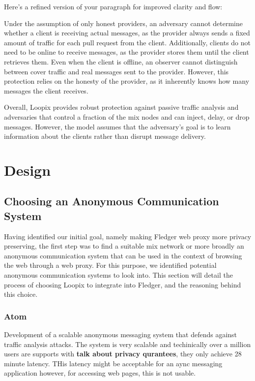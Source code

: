 \documentclass[a4paper,11pt,oneside]{report}
\begin{document}
Here's a refined version of your paragraph for improved clarity and flow:

Under the assumption of only honest providers, an adversary cannot determine whether a client is receiving actual messages, as the provider always sends a fixed amount of traffic for each pull request from the client. Additionally, clients do not need to be online to receive messages, as the provider stores them until the client retrieves them.  Even when the client is offline, an observer cannot distinguish between cover traffic and real messages sent to the provider. However, this protection relies on the honesty of the provider, as it inherently knows how many messages the client receives.

Overall, Loopix provides robust protection against passive traffic analysis and adversaries that control a fraction of the mix nodes and can inject, delay, or drop messages. However, the model assumes that the adversary’s goal is to learn information about the clients rather than disrupt message delivery.

\chapter{Design}


\section{Choosing an Anonymous Communication System}
\label{sec:mixers}
Having identified our initial goal, namely making Fledger web proxy more privacy preserving, the first step was to find a suitable mix network or more broadly an anonymous communication system that can be used in the context of browsing the web through a web proxy. For this purpose, we identified potential anonymous communication systems to look into. This section will detail the process of choosing Loopix to integrate into Fledger, and the reasoning behind this choice.

\subsection{Atom}
Development of a scalable anonymous messaging system that defends against traffic analysis attacks. The system is very scalable and techinically over a million users are supports with \textbf{talk about privacy qurantees}, they only achieve 28 minute latency. THis latency might be acceptable for an aync messaging application however, for accessing web pages, this is not usable.
\end{document}
